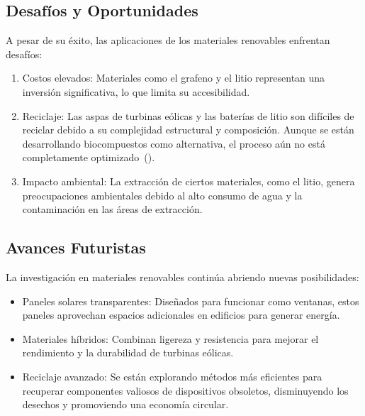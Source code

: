 \documentclass[letterpaper, 12pt]{article}
\begin{document}
\subsection*{Desafíos y Oportunidades}

A pesar de su éxito, las aplicaciones de los materiales renovables enfrentan
desafíos:

\begin{enumerate}
      \item Costos elevados: Materiales como el grafeno y el litio representan una
            inversión significativa, lo que limita su accesibilidad.

      \item Reciclaje: Las aspas de turbinas eólicas y las baterías de litio son difíciles
            de reciclar debido a su complejidad estructural y composición. Aunque se están
            desarrollando biocompuestos como alternativa, el proceso aún no está
            completamente optimizado~(\cite{Ebhota_Jen2019}).

      \item Impacto ambiental: La extracción de ciertos materiales, como el litio, genera
            preocupaciones ambientales debido al alto consumo de agua y la contaminación en
            las áreas de extracción.
\end{enumerate}

\subsection*{Avances Futuristas}

La investigación en materiales renovables continúa abriendo nuevas
posibilidades:

\begin{itemize}
      \item Paneles solares transparentes: Diseñados para funcionar como ventanas, estos
            paneles aprovechan espacios adicionales en edificios para generar energía.

      \item Materiales híbridos: Combinan ligereza y resistencia para mejorar el
            rendimiento y la durabilidad de turbinas eólicas.

      \item Reciclaje avanzado: Se están explorando métodos más eficientes para recuperar
            componentes valiosos de dispositivos obsoletos, disminuyendo los desechos y
            promoviendo una economía circular.
\end{itemize}
\end{document}
